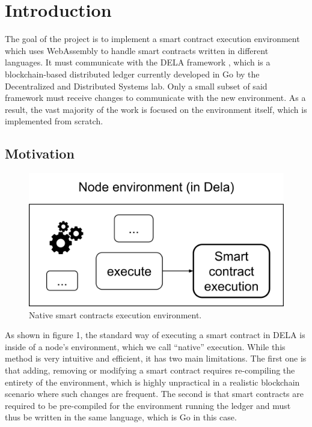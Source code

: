 \documentclass[11pt, a4paper, twoside, openright]{article}
\begin{document}


\newpage
\setcounter{page}{1}
\tableofcontents
\newpage
        

\section{Introduction}
The goal of the project is to implement a smart contract execution environment which uses WebAssembly \cite{webassembly} to handle smart contracts written in different languages. It must communicate with the DELA framework \cite{dela}, which is a blockchain-based distributed ledger currently developed in Go by the Decentralized and Distributed Systems lab.
Only a small subset of said framework must receive changes to communicate with the new environment. As a result, the vast majority of the work is focused on the environment itself, which is implemented from scratch.

\subsection{Motivation}

\begin{figure}[htbp]
 \centering
  \includegraphics[width=12cm]{wasm1.png}
  \caption{Native smart contracts execution environment.}
\end{figure}


As shown in figure 1, the standard way of executing a smart contract in DELA is inside of a node's environment, which we call ``native'' execution. While this method is very intuitive and efficient, it has two main limitations. The first one is that adding, removing or modifying a smart contract requires re-compiling the entirety of the environment, which is highly unpractical in a realistic blockchain scenario where such changes are frequent. The second is that smart contracts are required to be pre-compiled for the environment running the ledger and must thus be written in the same language, which is Go in this case.
\end{document}
